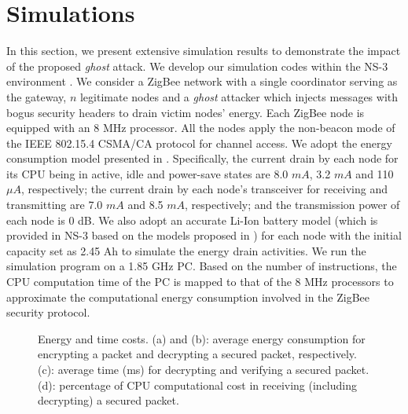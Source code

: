 \documentclass[10pt,journal,cspaper,compsoc]{IEEEtran}
\begin{document}
\section{Simulations}\label{simulation}
In this section, we present extensive simulation results to demonstrate the impact of the proposed {\em ghost} attack. We develop our simulation codes within the NS-3 environment \cite{NS3}. We consider a ZigBee network with a single coordinator serving as the gateway, $n$ legitimate nodes and a {\em ghost} attacker which injects messages with bogus security headers to drain victim nodes' energy. Each ZigBee node is equipped with an 8 MHz processor. All the nodes apply the non-beacon mode of the IEEE 802.15.4 CSMA/CA protocol for channel access. We adopt the energy consumption model presented in \cite{energymodel}. Specifically, the current drain by each node for its CPU being in active, idle and power-save states are 8.0 $mA$, 3.2 $mA$ and 110 $\mu A$, respectively; the current drain by each node's transceiver for receiving and transmitting are 7.0 $mA$ and 8.5 $mA$, respectively; and the transmission power of each node is 0 dB. We also adopt an accurate Li-Ion battery model (which is provided in NS-3 based on the models proposed in \cite{batterymodel1,batterymodel2}) for each node with the initial capacity set as 2.45 Ah to simulate the energy drain activities. We run the simulation program on a 1.85 GHz PC. Based on the number of instructions, the CPU computation time of the PC is mapped to that of the 8 MHz processors to approximate the computational energy consumption involved in the ZigBee security protocol.

\begin{figure*}[htbp]
	\centering
	\hspace{-3mm}
	\hspace{-3mm}
	\hspace{-3mm}
\vspace{-2mm}
	\caption{Energy and time costs. (a) and (b): average energy consumption for encrypting a packet and decrypting a secured packet, respectively. (c): average time (ms) for decrypting and verifying a secured packet. (d): percentage of CPU computational cost in receiving (including decrypting) a secured packet.}	
	\label{Fig_pcost}
\end{figure*}
\end{document}
